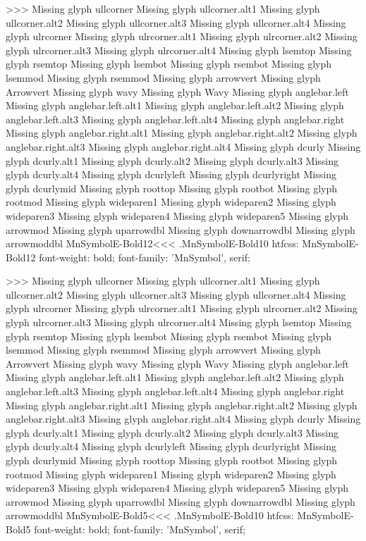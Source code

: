 >>>
Missing glyph	ullcorner
Missing glyph	ullcorner.alt1
Missing glyph	ullcorner.alt2
Missing glyph	ullcorner.alt3
Missing glyph	ullcorner.alt4
Missing glyph	ulrcorner
Missing glyph	ulrcorner.alt1
Missing glyph	ulrcorner.alt2
Missing glyph	ulrcorner.alt3
Missing glyph	ulrcorner.alt4
Missing glyph	lsemtop
Missing glyph	rsemtop
Missing glyph	lsembot
Missing glyph	rsembot
Missing glyph	lsemmod
Missing glyph	rsemmod
Missing glyph	arrowvert
Missing glyph	Arrowvert
Missing glyph	wavy
Missing glyph	Wavy
Missing glyph	anglebar.left
Missing glyph	anglebar.left.alt1
Missing glyph	anglebar.left.alt2
Missing glyph	anglebar.left.alt3
Missing glyph	anglebar.left.alt4
Missing glyph	anglebar.right
Missing glyph	anglebar.right.alt1
Missing glyph	anglebar.right.alt2
Missing glyph	anglebar.right.alt3
Missing glyph	anglebar.right.alt4
Missing glyph	dcurly
Missing glyph	dcurly.alt1
Missing glyph	dcurly.alt2
Missing glyph	dcurly.alt3
Missing glyph	dcurly.alt4
Missing glyph	dcurlyleft
Missing glyph	dcurlyright
Missing glyph	dcurlymid
Missing glyph	roottop
Missing glyph	rootbot
Missing glyph	rootmod
Missing glyph	wideparen1
Missing glyph	wideparen2
Missing glyph	wideparen3
Missing glyph	wideparen4
Missing glyph	wideparen5
Missing glyph	arrowmod
Missing glyph	uparrowdbl
Missing glyph	downarrowdbl
Missing glyph	arrowmoddbl
\<MnSymbolE-Bold12\><<<
.MnSymbolE-Bold10
htfcss:  MnSymbolE-Bold12  font-weight: bold; font-family: 'MnSymbol', serif;

>>>
Missing glyph	ullcorner
Missing glyph	ullcorner.alt1
Missing glyph	ullcorner.alt2
Missing glyph	ullcorner.alt3
Missing glyph	ullcorner.alt4
Missing glyph	ulrcorner
Missing glyph	ulrcorner.alt1
Missing glyph	ulrcorner.alt2
Missing glyph	ulrcorner.alt3
Missing glyph	ulrcorner.alt4
Missing glyph	lsemtop
Missing glyph	rsemtop
Missing glyph	lsembot
Missing glyph	rsembot
Missing glyph	lsemmod
Missing glyph	rsemmod
Missing glyph	arrowvert
Missing glyph	Arrowvert
Missing glyph	wavy
Missing glyph	Wavy
Missing glyph	anglebar.left
Missing glyph	anglebar.left.alt1
Missing glyph	anglebar.left.alt2
Missing glyph	anglebar.left.alt3
Missing glyph	anglebar.left.alt4
Missing glyph	anglebar.right
Missing glyph	anglebar.right.alt1
Missing glyph	anglebar.right.alt2
Missing glyph	anglebar.right.alt3
Missing glyph	anglebar.right.alt4
Missing glyph	dcurly
Missing glyph	dcurly.alt1
Missing glyph	dcurly.alt2
Missing glyph	dcurly.alt3
Missing glyph	dcurly.alt4
Missing glyph	dcurlyleft
Missing glyph	dcurlyright
Missing glyph	dcurlymid
Missing glyph	roottop
Missing glyph	rootbot
Missing glyph	rootmod
Missing glyph	wideparen1
Missing glyph	wideparen2
Missing glyph	wideparen3
Missing glyph	wideparen4
Missing glyph	wideparen5
Missing glyph	arrowmod
Missing glyph	uparrowdbl
Missing glyph	downarrowdbl
Missing glyph	arrowmoddbl
\<MnSymbolE-Bold5\><<<
.MnSymbolE-Bold10
htfcss:  MnSymbolE-Bold5  font-weight: bold; font-family: 'MnSymbol', serif;


